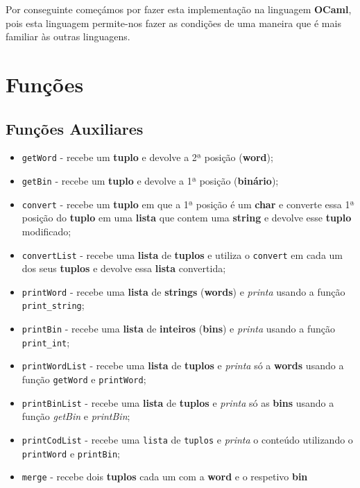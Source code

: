 \documentclass[11pt]{article}   %
\begin{document}
Por conseguinte começámos por fazer esta implementação na linguagem \textbf{OCaml}, pois esta
linguagem permite-nos fazer as condições de uma maneira que é mais familiar às outras linguagens.
\newpage
\section{Funções}

\subsection{Funções Auxiliares}

\begin{itemize}
    \item \verb|getWord| - recebe um \textbf{tuplo} e devolve a 2ª posição (\textbf{word});
    \item \verb|getBin| - recebe um \textbf{tuplo} e devolve a 1ª posição (\textbf{binário});
    \item \verb|convert| - recebe um \textbf{tuplo} em que a 1ª posição é um \textbf{char} e 
    converte essa 1ª posição do \textbf{tuplo} em uma \textbf{lista} que contem uma \textbf{string}
    e devolve esse \textbf{tuplo} modificado;
    \item \verb|convertList| - recebe uma \textbf{lista} de \textbf{tuplos} e utiliza o \verb|convert|
    em cada um dos seus \textbf{tuplos} e devolve essa \textbf{lista} convertida;
    \item \verb|printWord| - recebe uma \textbf{lista} de \textbf{strings} (\textbf{words}) e 
    \textit{printa} usando a função \verb|print_string|;
    \item \verb|printBin| - recebe uma \textbf{lista} de \textbf{inteiros} (\textbf{bins}) e 
    \textit{printa} usando a função \verb|print_int|;
    \item \verb|printWordList| - recebe uma \textbf{lista} de \textbf{tuplos} e \textit{printa} só a 
    \textbf{words} usando a função \verb|getWord| e \verb|printWord|;
    \item \verb|printBinList| - recebe uma \textbf{lista} de \textbf{tuplos} e \textit{printa} só as 
    \textbf{bins} usando a função \textit{getBin} e \textit{printBin};
    \item \verb|printCodList| - recebe uma \verb|lista| de \verb|tuplos| e \textit{printa} o conteúdo
    utilizando o \verb|printWord| e \verb|printBin|;
    \item \verb|merge| - recebe dois \textbf{tuplos} cada um com a \textbf{word} e o respetivo \textbf{bin}

\end{itemize}
\end{document}
